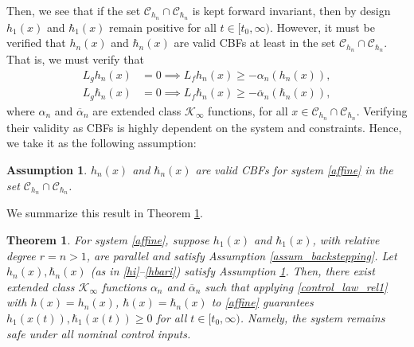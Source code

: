 \documentclass[letterpaper, 10 pt, conference]{ieeeconf}
\newtheorem{theorem}{Theorem}
\newtheorem{assumption}{Assumption}
\begin{document}
Then, we see that if the set $\mathcal{C}_{h_n}\cap\mathcal{C}_{\hbar_n}$ is kept forward invariant, then by design $h_1(x)$ and $\hbar_1(x)$ remain positive for all $t \in [t_0,\infty)$. However, it must be verified that $h_n(x)$ and $\hbar_n(x)$ are valid CBFs at least in the set $\mathcal{C}_{h_n}\cap\mathcal{C}_{\hbar_n}$. That is, we must verify that 
\begin{align}
    L_gh_n(x) &= 0 \implies L_fh_n(x)  \geq -\alpha_n(h_n(x)),\label{cbfcond_hn}\\
    L_g\hbar_n(x) &= 0 \implies L_f\hbar_n(x) \geq -\overline{\alpha}_n(\hbar_n(x))\label{cbfcond_hbarn},
\end{align}
where $\alpha_n$ and $\overline{\alpha}_n$ are extended class $\mathcal{K}_\infty$ functions, for all $x \in \mathcal{C}_{h_n}\cap\mathcal{C}_{\hbar_n}$. Verifying their validity as CBFs is highly dependent on the system and constraints. Hence, we take it as the following assumption:
\begin{assumption}\label{assum_hn_cbf}
    $h_n(x)$ and $\hbar_n(x)$ are valid CBFs for system \eqref{affine} in the set $\mathcal{C}_{h_n}\cap\mathcal{C}_{\hbar_n}$.
\end{assumption}

We summarize this result in Theorem \ref{thrm_highrel_safe}.

\begin{theorem}\label{thrm_highrel_safe}  
For system \eqref{affine}, suppose $ h_1(x) $ and $ \hbar_1(x) $, with relative degree $ r = n > 1 $, are parallel and satisfy Assumption \ref{assum_backstepping}. Let $ h_n(x), \hbar_n(x) $ (as in \eqref{hi}--\eqref{hbari}) satisfy Assumption \ref{assum_hn_cbf}. Then, there exist extended class $ \mathcal{K}_\infty $ functions $ \alpha_n$ and $ \overline{\alpha}_n $ such that applying \eqref{control_law_rel1} with $ h(x) = h_n(x) $, $ \hbar(x) = \hbar_n(x) $ to \eqref{affine} guarantees $ h_1(x(t)), \hbar_1(x(t)) \geq 0 $ for all $ t \in [t_0, \infty) $. Namely, the system remains safe under all nominal control inputs.
\end{theorem}  
\end{document}
